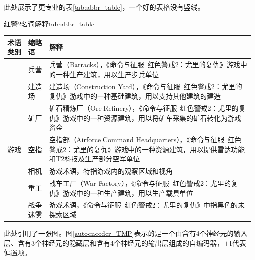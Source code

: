 \documentclass[a4paper,AutoFakeBold,oneside,12pt]{book}
\begin{document}
此处展示了更专业的表\ref{tab:abbr_table}，一个好的表格没有竖线。
\begin{bupttable}{红警2名词解释}{tab:abbr_table}
    \begin{tabularx}{\textwidth}{llX}
        \toprule
        \textbf{术语类别} & \textbf{缩略语} & \textbf{解释} \\ \midrule
        & 兵营 & 兵营（Barracks），《命令与征服\ 红色警戒2：尤里的复仇》游戏中的一种生产建筑，用以生产步兵单位 \\ \cmidrule(l){2-3}
        & 建造场 & 建造场（Construction Yard），《命令与征服\ 红色警戒2：尤里的复仇》游戏中的一种基础建筑，用以支持其他建筑的建造 \\ \cmidrule(l){2-3}
        & 矿厂 & 矿石精炼厂（Ore Refinery），《命令与征服\ 红色警戒2：尤里的复仇》游戏中的一种资源建筑，用以将矿车采集的矿石转化为游戏资金 \\ \cmidrule(l){2-3}
        游戏 & 空指 & 空指部（Airforce Command Headquarters），《命令与征服\ 红色警戒2：尤里的复仇》游戏中的一种资源建筑，用以提供雷达功能和T2科技及生产部分空军单位 \\ \cmidrule(l){2-3}
        & 相机 & 游戏术语，特指游戏内的观察区域和视角 \\ \cmidrule(l){2-3}
        & 重工 & 战车工厂（War Factory），《命令与征服\ 红色警戒2：尤里的复仇》游戏中的一种生产建筑，用以生产载具单位 \\ \cmidrule(l){2-3}
        & 战争迷雾 & 游戏术语，《命令与征服\ 红色警戒2：尤里的复仇》中指黑色的未探索区域 \\ \bottomrule
    \end{tabularx}
\end{bupttable}

此处引用了一张图。图\ref{autoencoder_TMP}表示的是一个由含有4个神经元的输入层、含有3个神经元的隐藏层和含有4个神经元的输出层组成的自编码器，$+1$代表偏置项。

\end{document}
